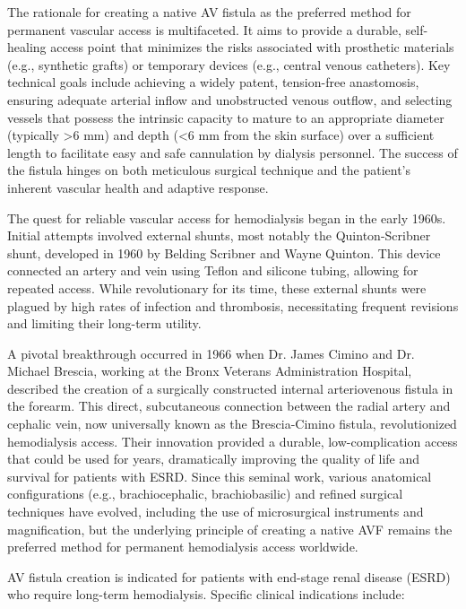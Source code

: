 The rationale for creating a native AV fistula as the preferred method for permanent vascular access is multifaceted. It aims to provide a durable, self-healing access point that minimizes the risks associated with prosthetic materials (e.g., synthetic grafts) or temporary devices (e.g., central venous catheters). Key technical goals include achieving a widely patent, tension-free anastomosis, ensuring adequate arterial inflow and unobstructed venous outflow, and selecting vessels that possess the intrinsic capacity to mature to an appropriate diameter (typically >6 mm) and depth (<6 mm from the skin surface) over a sufficient length to facilitate easy and safe cannulation by dialysis personnel. The success of the fistula hinges on both meticulous surgical technique and the patient's inherent vascular health and adaptive response.

The quest for reliable vascular access for hemodialysis began in the early 1960s. Initial attempts involved external shunts, most notably the Quinton-Scribner shunt, developed in 1960 by Belding Scribner and Wayne Quinton. This device connected an artery and vein using Teflon and silicone tubing, allowing for repeated access. While revolutionary for its time, these external shunts were plagued by high rates of infection and thrombosis, necessitating frequent revisions and limiting their long-term utility.

A pivotal breakthrough occurred in 1966 when Dr. James Cimino and Dr. Michael Brescia, working at the Bronx Veterans Administration Hospital, described the creation of a surgically constructed internal arteriovenous fistula in the forearm. This direct, subcutaneous connection between the radial artery and cephalic vein, now universally known as the Brescia-Cimino fistula, revolutionized hemodialysis access. Their innovation provided a durable, low-complication access that could be used for years, dramatically improving the quality of life and survival for patients with ESRD. Since this seminal work, various anatomical configurations (e.g., brachiocephalic, brachiobasilic) and refined surgical techniques have evolved, including the use of microsurgical instruments and magnification, but the underlying principle of creating a native AVF remains the preferred method for permanent hemodialysis access worldwide.

AV fistula creation is indicated for patients with end-stage renal disease (ESRD) who require long-term hemodialysis. Specific clinical indications include:

